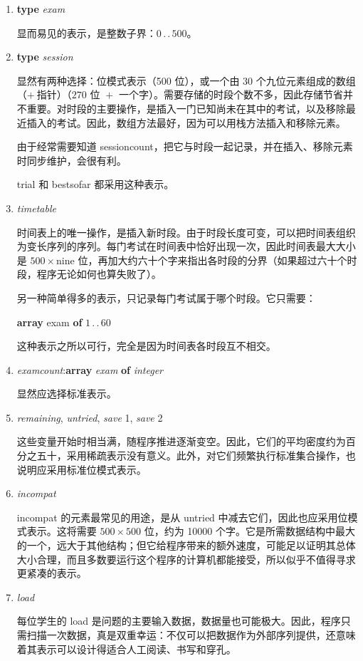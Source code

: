 \documentclass[twoside,11pt,fontset=none]{ctexbook}
\begin{document}
\begin{enumerate}[wide, nosep, label=(\arabic*)]
	\item \textbf{type} \textit{exam}

	\noindent
	显而易见的表示，是整数子界：$0\,.\,.\,500$。

	\item \textbf{type} \textit{session}

	\noindent
	显然有两种选择：位模式表示（500 位），或一个由 30 个九位元素组成的数组（$+\ \text{指针}$）（$270 \text{ 位 } + \text{ 一个字}$）。需要存储的时段个数不多，因此存储节省并不重要。对时段的主要操作，是插入一门已知尚未在其中的考试，以及移除最近插入的考试。因此，数组方法最好，因为可以用栈方法插入和移除元素。

	由于经常需要知道 sessioncount，把它与时段一起记录，并在插入、移除元素时同步维护，会很有利。

	trial 和 bestsofar 都采用这种表示。

	\item \textit{timetable}

	\noindent
	时间表上的唯一操作，是插入新时段。由于时段长度可变，可以把时间表组织为变长序列的序列。每门考试在时间表中恰好出现一次，因此时间表最大大小是 $500 \times \text{nine}$ 位，再加大约六十个字来指出各时段的分界（如果超过六十个时段，程序无论如何也算失败了）。

	另一种简单得多的表示，只记录每门考试属于哪个时段。它只需要：

	\quad \textbf{array} exam \textbf{of} $1\,.\,.\,60$

	\noindent
	这种表示之所以可行，完全是因为时间表各时段互不相交。

	\item \textit{examcount}:\textbf{array} \textit{exam} \textbf{of} \textit{integer}

	\noindent
	显然应选择标准表示。

	\item \textit{remaining}, \textit{untried}, \textit{save} 1, \textit{save} 2

	\noindent
	这些变量开始时相当满，随程序推进逐渐变空。因此，它们的平均密度约为百分之五十，采用稀疏表示没有意义。此外，对它们频繁执行标准集合操作，也说明应采用标准位模式表示。

	\item \textit{incompat}

	\noindent
	incompat 的元素最常见的用途，是从 untried 中减去它们，因此也应采用位模式表示。这将需要 $500 \times 500 \text{ 位}$，约为 10000 个字。它是所需数据结构中最大的一个，远大于其他结构；但它给程序带来的额外速度，可能足以证明其总体大小合理，而且多数要运行这个程序的计算机都能接受，所以似乎不值得寻求更紧凑的表示。

	\item \textit{load}

	\noindent
	每位学生的 load 是问题的主要输入数据，数据量也可能极大。因此，程序只需扫描一次数据，真是双重幸运：不仅可以把数据作为外部序列提供，还意味着其表示可以设计得适合人工阅读、书写和穿孔。

\end{enumerate}
\end{document}
